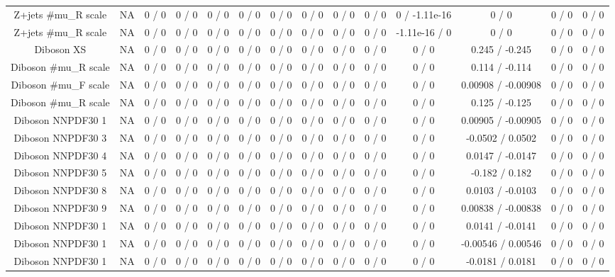 \documentclass[10pt]{article}
\begin{document}
\begin{table}[htbp]
\begin{center}
\begin{tabular}{|c|c|c|c|c|c|c|c|c|c|c|c|c|c|}
  Z+jets #mu_{R} scale &    NA    & 0 / 0 & 0 / 0 & 0 / 0 & 0 / 0 & 0 / 0 & 0 / 0 & 0 / 0 & 0 / 0 & 0 / -1.11e-16 & 0 / 0 & 0 / 0 & 0 / 0 \\ 
  Z+jets #mu_{R} scale &    NA    & 0 / 0 & 0 / 0 & 0 / 0 & 0 / 0 & 0 / 0 & 0 / 0 & 0 / 0 & 0 / 0 & -1.11e-16 / 0 & 0 / 0 & 0 / 0 & 0 / 0 \\ 
  Diboson XS &    NA    & 0 / 0 & 0 / 0 & 0 / 0 & 0 / 0 & 0 / 0 & 0 / 0 & 0 / 0 & 0 / 0 & 0 / 0 & 0.245 / -0.245 & 0 / 0 & 0 / 0 \\ 
  Diboson #mu_{R} scale &    NA    & 0 / 0 & 0 / 0 & 0 / 0 & 0 / 0 & 0 / 0 & 0 / 0 & 0 / 0 & 0 / 0 & 0 / 0 & 0.114 / -0.114 & 0 / 0 & 0 / 0 \\ 
  Diboson #mu_{F} scale &    NA    & 0 / 0 & 0 / 0 & 0 / 0 & 0 / 0 & 0 / 0 & 0 / 0 & 0 / 0 & 0 / 0 & 0 / 0 & 0.00908 / -0.00908 & 0 / 0 & 0 / 0 \\ 
  Diboson #mu_{R} scale &    NA    & 0 / 0 & 0 / 0 & 0 / 0 & 0 / 0 & 0 / 0 & 0 / 0 & 0 / 0 & 0 / 0 & 0 / 0 & 0.125 / -0.125 & 0 / 0 & 0 / 0 \\ 
  Diboson NNPDF30 1 &    NA    & 0 / 0 & 0 / 0 & 0 / 0 & 0 / 0 & 0 / 0 & 0 / 0 & 0 / 0 & 0 / 0 & 0 / 0 & 0.00905 / -0.00905 & 0 / 0 & 0 / 0 \\ 
  Diboson NNPDF30 3 &    NA    & 0 / 0 & 0 / 0 & 0 / 0 & 0 / 0 & 0 / 0 & 0 / 0 & 0 / 0 & 0 / 0 & 0 / 0 & -0.0502 / 0.0502 & 0 / 0 & 0 / 0 \\ 
  Diboson NNPDF30 4 &    NA    & 0 / 0 & 0 / 0 & 0 / 0 & 0 / 0 & 0 / 0 & 0 / 0 & 0 / 0 & 0 / 0 & 0 / 0 & 0.0147 / -0.0147 & 0 / 0 & 0 / 0 \\ 
  Diboson NNPDF30 5 &    NA    & 0 / 0 & 0 / 0 & 0 / 0 & 0 / 0 & 0 / 0 & 0 / 0 & 0 / 0 & 0 / 0 & 0 / 0 & -0.182 / 0.182 & 0 / 0 & 0 / 0 \\ 
  Diboson NNPDF30 8 &    NA    & 0 / 0 & 0 / 0 & 0 / 0 & 0 / 0 & 0 / 0 & 0 / 0 & 0 / 0 & 0 / 0 & 0 / 0 & 0.0103 / -0.0103 & 0 / 0 & 0 / 0 \\ 
  Diboson NNPDF30 9 &    NA    & 0 / 0 & 0 / 0 & 0 / 0 & 0 / 0 & 0 / 0 & 0 / 0 & 0 / 0 & 0 / 0 & 0 / 0 & 0.00838 / -0.00838 & 0 / 0 & 0 / 0 \\ 
  Diboson NNPDF30 1 &    NA    & 0 / 0 & 0 / 0 & 0 / 0 & 0 / 0 & 0 / 0 & 0 / 0 & 0 / 0 & 0 / 0 & 0 / 0 & 0.0141 / -0.0141 & 0 / 0 & 0 / 0 \\ 
  Diboson NNPDF30 1 &    NA    & 0 / 0 & 0 / 0 & 0 / 0 & 0 / 0 & 0 / 0 & 0 / 0 & 0 / 0 & 0 / 0 & 0 / 0 & -0.00546 / 0.00546 & 0 / 0 & 0 / 0 \\ 
  Diboson NNPDF30 1 &    NA    & 0 / 0 & 0 / 0 & 0 / 0 & 0 / 0 & 0 / 0 & 0 / 0 & 0 / 0 & 0 / 0 & 0 / 0 & -0.0181 / 0.0181 & 0 / 0 & 0 / 0 \\ 

\end{tabular}
\end{center}
\end{table}
\end{document}
